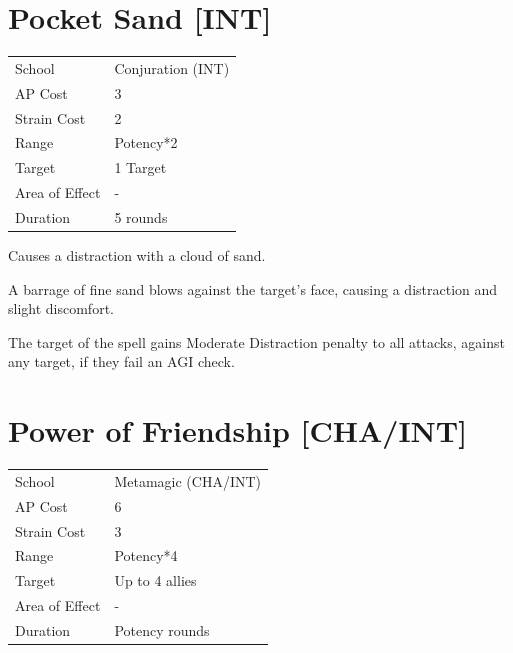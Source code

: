 \documentclass[11pt,a4paper,twocolumn]{book}
\begin{document}
\section*{Pocket Sand [INT]}
{
	\begin{tabu} to 75mm{| X[l,4] | X[l,7] |}
		\hline
		School 			& Conjuration (INT) 	\\
        AP Cost	      	& 3 					\\
        Strain Cost     & 2 					\\
        Range     		& Potency*2				\\
        Target      	& 1 Target				\\
        Area of Effect  & -  	 				\\
        Duration     	& 5 rounds				\\ \hline
	\end{tabu}
		
}

\medskip

Causes a distraction with a cloud of sand.

A barrage of fine sand blows against the target's face, causing a distraction and slight discomfort.

The target of the spell gains Moderate Distraction penalty to all attacks, against any target, if they fail an AGI check.

\vfill


\section*{Power of Friendship [CHA/INT]}
{
	\begin{tabu} to 75mm{| X[l,4] | X[l,7] |}
		\hline
		School 			& Metamagic (CHA/INT) 	\\
        AP Cost	      	& 6 					\\
        Strain Cost     & 3 					\\
        Range     		& Potency*4				\\
        Target      	& Up to 4 allies		\\
        Area of Effect  & -  	 				\\
        Duration     	& Potency rounds		\\ \hline
	\end{tabu}
		
}
\end{document}
